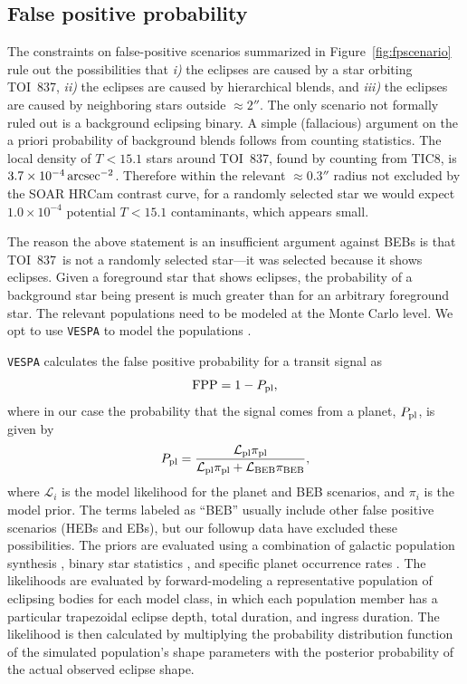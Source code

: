 \documentclass[12pt,twocolumn,tighten]{aastex63}
\newcommand{\tn}{TOI~837} %
\begin{document}
\subsection{False positive probability}
\label{subsec:fpp}

The constraints on false-positive scenarios summarized in
Figure~\ref{fig:fpscenario} rule out the possibilities that {\it i)}
the eclipses are caused by a star orbiting \tn, {\it ii)} the eclipses
are caused by hierarchical blends, and {\it iii)} the eclipses are
caused by neighboring stars outside $\approx 2''$.  The only scenario
not formally ruled out is a background eclipsing binary.  A simple
(fallacious) argument on the a priori probability of background blends
follows from counting statistics.  The local density of $T<15.1$ stars
around \tn, found by counting from TIC8, is $3.7\times10^{-4} \,{\rm
arcsec}^{-2}$.  Therefore within the relevant $\approx0.3''$ radius
not excluded by the SOAR HRCam contrast curve, for a randomly selected
star we would expect $1.0\times10^{-4}$ potential $T<15.1$
contaminants, which appears small.

The reason the above statement is an insufficient argument against
BEBs is that \tn\ is not a randomly selected star---it was selected
because it shows eclipses.  Given a foreground star that shows
eclipses, the probability of a background star being present is much
greater than for an arbitrary foreground star.  The relevant
populations need to be modeled at the Monte Carlo level.  We opt to
use \texttt{VESPA} to model the populations
\citep{morton_efficient_2012,vespa_2015}.

\texttt{VESPA} calculates the false positive probability for a transit
signal as
\begin{equation}
  {\rm FPP} = 1 - P_{\rm pl},
\end{equation}
where in our case the probability that the signal comes from a planet,
$P_{\rm pl}$, is given by
\begin{align}
  P_{\rm pl} = 
  \frac{
    \mathcal{L}_{\rm pl}\pi_{\rm pl}
  }{
    \mathcal{L}_{\rm pl}\pi_{\rm pl} + \mathcal{L}_{\rm BEB}\pi_{\rm BEB}
  },
\end{align}
where $\mathcal{L}_i$ is the model likelihood for the planet and BEB
scenarios, and $\pi_i$ is the model prior.  The terms labeled as
``BEB'' usually include other false positive scenarios (HEBs and EBs),
but our followup data have excluded these possibilities.  The priors
are evaluated using a combination of galactic population synthesis
\citep{girardi_star_2005}, binary star statistics
\citep{raghavan_survey_2010}, and specific planet occurrence rates
\citep[][Section~3.4]{morton_efficient_2012}.  The likelihoods are
evaluated by forward-modeling a representative population of eclipsing
bodies for each model class, in which each population member has a
particular trapezoidal eclipse depth, total duration, and ingress
duration.  The likelihood is then calculated by multiplying the
probability distribution function of the simulated population's shape
parameters with the posterior probability of the actual observed
eclipse shape.
\end{document}
